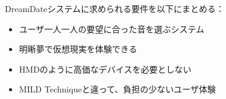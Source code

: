 DreamDateシステムに求められる要件を以下にまとめる：
\begin{itemize}
\item ユーザ一人一人の要望に合った音を選ぶシステム
\item 明晰夢で仮想現実を体験できる
\item HMDのように高価なデバイスを必要としない
\item MILD Techniqueと違って、負担の少ないユーザ体験
\end{itemize}